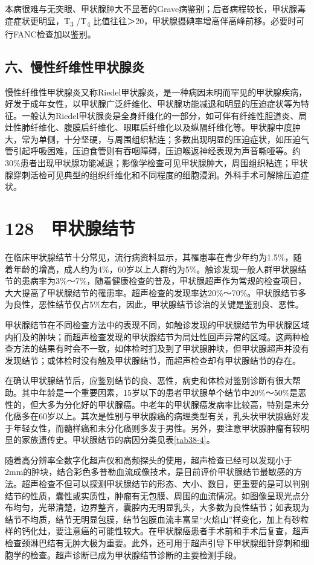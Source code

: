 本病很难与无突眼、甲状腺肿大不显著的Grave病鉴别；后者病程较长，甲状腺毒症症状更明显，T\textsubscript{3}
/T\textsubscript{4}
比值往往＞20，甲状腺摄碘率增高伴高峰前移。必要时可行FANC检查加以鉴别。

\subsection{六、慢性纤维性甲状腺炎}

慢性纤维性甲状腺炎又称Riedel甲状腺炎，是一种病因未明而罕见的甲状腺疾病，好发于成年女性，以甲状腺广泛纤维化、甲状腺功能减退和明显的压迫症状等为特征。一般认为Riedel甲状腺炎是全身纤维化的一部分，如可伴有纤维性胆道炎、局灶性肺纤维化、腹膜后纤维化、眼眶后纤维化以及纵隔纤维化等。甲状腺中度肿大，常为单侧，十分坚硬，与周围组织粘连；多数出现明显的压迫症状，如压迫气管引起呼吸困难，压迫食管则有吞咽障碍，压迫喉返神经表现为声音嘶哑等。约30\%患者出现甲状腺功能减退；影像学检查可见甲状腺肿大，周围组织粘连；甲状腺穿刺活检可见典型的组织纤维化和不同程度的细胞浸润。外科手术可解除压迫症状。

\protect\hypertarget{text00304.html}{}{}

\section{128　甲状腺结节}

在临床甲状腺结节十分常见，流行病资料显示，其罹患率在青少年约为1.5\%，随着年龄的增高，成人约为4\%，60岁以上人群约为5\%。触诊发现一般人群甲状腺结节的患病率为3\%～7\%，随着健康检查的普及，甲状腺超声作为常规的检查项目，大大提高了甲状腺结节的罹患率。超声检查的发现率达20\%～70\%。甲状腺结节多为良性，恶性结节仅占5\%左右，因此，甲状腺结节诊治的关键是鉴别良、恶性。

甲状腺结节在不同检查方法中的表现不同，如触诊发现的甲状腺结节为甲状腺区域内扪及的肿块；而超声检查发现的甲状腺结节为局灶性回声异常的区域。这两种检查方法的结果有时会不一致，如体检时扪及到了甲状腺肿块，但甲状腺超声并没有发现结节；或体检时没有触及甲状腺结节，而超声检查却有甲状腺结节的存在。

在确认甲状腺结节后，应鉴别结节的良、恶性，病史和体检对鉴别诊断有很大帮助。其中年龄是一个重要因素，15岁以下的患者甲状腺单个结节中20\%～50\%是恶性的，但大多为分化好的甲状腺癌。中老年的甲状腺癌发病率比较高，特别是未分化癌多在60岁以上。其次是性别与甲状腺癌的病理类型有关，乳头状甲状腺癌好发于年轻女性，而髓样癌和未分化癌则多发于男性。另外，要注意甲状腺肿瘤有较明显的家族遗传史。甲状腺结节的病因分类见表\ref{tab38-4}。

随着高分辨率全数字化超声仪和高频探头的使用，超声检查已经可以发现小于2mm的肿块，结合彩色多普勒血流成像技术，是目前评价甲状腺结节最敏感的方法。超声检查不但可以探测甲状腺结节的形态、大小、数目，更重要的是可以判别结节的性质，囊性或实质性，肿瘤有无包膜、周围的血流情况。如图像呈现光点分布均匀，光带清楚，边界整齐，囊腔内无明显乳头，大多数为良性结节；如表现为结节不均质，结节无明显包膜，结节包膜血流丰富呈“火焰山”样变化，加上有砂粒样的钙化灶，要注意癌的可能性较大。在甲状腺癌患者手术前和手术后复查，超声检查颈淋巴结有无肿大极为重要。此外，还可用于超声引导下甲状腺细针穿刺和细胞学的检查。超声诊断已成为甲状腺结节诊断的主要检测手段。

